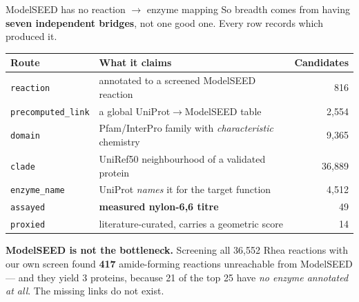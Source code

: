 \documentclass[aspectratio=169,10pt]{beamer}
\newcommand{\good}[1]{{\color{cGood}\textbf{#1}}}
\newcommand{\bad}[1]{{\color{cBad}#1}}
\newcommand{\takeaway}[1]{\vfill\begin{tcolorbox}[colback=structure!12!white,
  colframe=structure!60!black,boxrule=0.4pt,left=5pt,right=5pt,top=3pt,bottom=3pt]
  \small #1\end{tcolorbox}}
\begin{document}
\begin{frame}{ModelSEED has no reaction $\rightarrow$ enzyme mapping}
  So breadth comes from having \textbf{seven independent bridges}, not one good
  one. Every row records which produced it.

  \smallskip
  \centering\footnotesize
  \begin{tabular}{llr}
    \toprule
    \textbf{Route} & \textbf{What it claims} & \textbf{Candidates} \\
    \midrule
    \texttt{reaction}          & annotated to a screened ModelSEED reaction & 816 \\
    \texttt{precomputed\_link} & a global UniProt$\rightarrow$ModelSEED table & 2{,}554 \\
    \texttt{domain}            & Pfam/InterPro family with \emph{characteristic} chemistry & 9{,}365 \\
    \texttt{clade}             & UniRef50 neighbourhood of a validated protein & 36{,}889 \\
    \texttt{enzyme\_name}      & UniProt \emph{names} it for the target function & 4{,}512 \\
    \texttt{assayed}           & \good{measured nylon-6,6 titre} & 49 \\
    \texttt{proxied}           & literature-curated, carries a geometric score & 14 \\
    \bottomrule
  \end{tabular}

  \takeaway{\textbf{ModelSEED is not the bottleneck.} Screening all 36{,}552
  Rhea reactions with our own screen found \textbf{417} amide-forming reactions
  unreachable from ModelSEED --- and they yield \bad{3} proteins, because 21 of
  the top 25 have \emph{no enzyme annotated at all}. The missing links do not
  exist.}
\end{frame}
\end{document}
